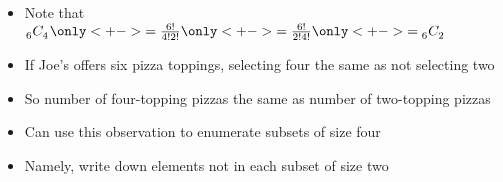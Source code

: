 \documentclass[handout]{beamer}
\theoremstyle{definition}
\newcommand\ncr[2]{\tensor[_{#1}]C{_{#2}}}
\begin{document}
\begin{frame}
\begin{multicols}{2}
\begin{itemize}
\item Note that $\ncr{6}{4}
\only<+->{=\frac{6!}{4!2!}}
\only<+->{=\frac{6!}{2!4!}}
\only<+->{=\ncr{6}{2}}$
\item If Joe's offers six pizza toppings,
selecting four the same as \alert{not}
selecting two
\item So number of four-topping pizzas
the same as number of two-topping pizzas
\item Can use this observation to enumerate
subsets of size four
\item Namely,
write down elements \alert{not} in 
each subset of size two
\end{itemize}
\columnbreak
{}
\end{multicols}
\end{frame}
\end{document}
